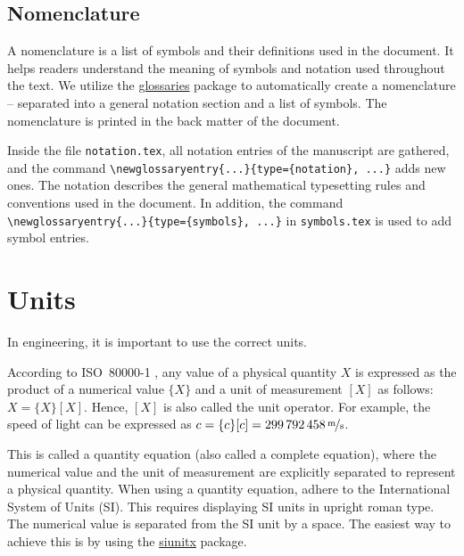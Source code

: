 \subsection{Nomenclature}
\label{subsec:nomenclature}
A nomenclature is a list of symbols and their definitions used in the document. It helps readers understand the meaning of symbols and notation used throughout the text. We utilize the \href{https://ctan.org/pkg/glossaries}{glossaries} package to automatically create a nomenclature -- separated into a general notation section and a list of symbols. The nomenclature is printed in the back matter of the document.

\begin{infobox}[title={Adding notation and symbol entries}]
	Inside the file \texttt{notation.tex}, all notation entries of the manuscript are gathered, and the command \verb|\newglossaryentry{...}{type={notation}, ...}| adds new ones. The notation describes the general mathematical typesetting rules and conventions used in the document. In addition, the command \verb|\newglossaryentry{...}{type={symbols}, ...}| in \texttt{symbols.tex} is used to add symbol entries.
\end{infobox}

\section{Units}
\label{sec:units}
In engineering, it is important to use the correct units.

\begin{infobox}[title={Physical quantity components}]
	According to ISO~80000-1 \cite{ISO80000-1-2022}, any value of a physical quantity $X$ is expressed as the product of a numerical value $\{X\}$ and a unit of measurement $[X]$ as follows: $X = \{X\} [X]$. Hence, $[X]$ is also called the unit operator. For example, the speed of light can be expressed as $c = \{c\} [c] = \SI[per-mode=fraction, fraction-command=\nicefrac]{299792458}{\meter\per\second}$.
\end{infobox}

This is called a quantity equation (also called a complete equation), where the numerical value and the unit of measurement are explicitly separated to represent a physical quantity. When using a quantity equation, adhere to the International System of Units (SI). This requires displaying SI units in upright roman type. The numerical value is separated from the SI unit by a space. The easiest way to achieve this is by using the \href{https://ctan.org/pkg/siunitx}{siunitx} package.

